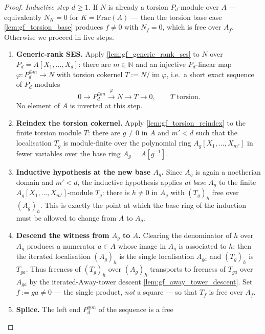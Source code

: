 \begin{proof}
  \emph{Inductive step \(d \ge 1\).} If \(N\) is already a torsion \(P_d\)-module over
  \(A\) — equivalently \(N_K = 0\) for \(K = \mathrm{Frac}(A)\) — then the torsion base
  case \cref{lem:gf_torsion_base} produces \(f \ne 0\) with \(N_f = 0\), which is free
  over \(A_f\). Otherwise we proceed in five steps.
  \begin{enumerate}
    \item \textbf{Generic-rank SES.} Apply \cref{lem:gf_generic_rank_ses} to \(N\) over
      \(P_d = A[X_1, \dots, X_d]\): there are \(m \in \mathbb{N}\) and an injective
      \(P_d\)-linear map \(\varphi : P_d^{\oplus m} \to N\) with torsion cokernel
      \(T := N / \operatorname{im}\varphi\), i.e.\ a short exact sequence of
      \(P_d\)-modules
      \[
        0 \to P_d^{\oplus m} \xrightarrow{\ \varphi\ } N \to T \to 0,
        \qquad T \text{ torsion}.
      \]
      No element of \(A\) is inverted at this step.
    \item \textbf{Reindex the torsion cokernel.} Apply \cref{lem:gf_torsion_reindex} to the
      finite torsion module \(T\): there are \(g \ne 0\) in \(A\) and \(m' < d\) such that
      the localisation \(T_g\) is module-finite over the polynomial ring
      \(A_g[X_1, \dots, X_{m'}]\) in fewer variables over the base ring \(A_g = A[g^{-1}]\).
    \item \textbf{Inductive hypothesis at the new base \(A_g\).} Since \(A_g\) is again a
      noetherian domain and \(m' < d\), the inductive hypothesis applies \emph{at base
      \(A_g\)} to the finite \(A_g[X_1, \dots, X_{m'}]\)-module \(T_g\): there is
      \(h \ne 0\) in \(A_g\) with \((T_g)_h\) free over \((A_g)_h\). This is exactly the
      point at which the base ring of the induction must be allowed to change from \(A\)
      to \(A_g\).
    \item \textbf{Descend the witness from \(A_g\) to \(A\).} Clearing the denominator of
      \(h\) over \(A_g\) produces a numerator \(a \in A\) whose image in \(A_g\) is associated
      to \(h\); then the iterated localisation \((A_g)_h\) is the single localisation
      \(A_{g a}\) and \((T_g)_h\) is \(T_{g a}\). Thus freeness of \((T_g)_h\) over
      \((A_g)_h\) transports to freeness of \(T_{g a}\) over \(A_{g a}\) by the
      iterated-\(\mathrm{Away}\)-tower descent \cref{lem:gf_away_tower_descent}. Set
      \(f := g a \ne 0\) — the single product, \emph{not} a square — so that \(T_f\) is free
      over \(A_f\).
    \item \textbf{Splice.} The left end \(P_d^{\oplus m}\) of the sequence is a free

\end{enumerate}
\end{proof}
